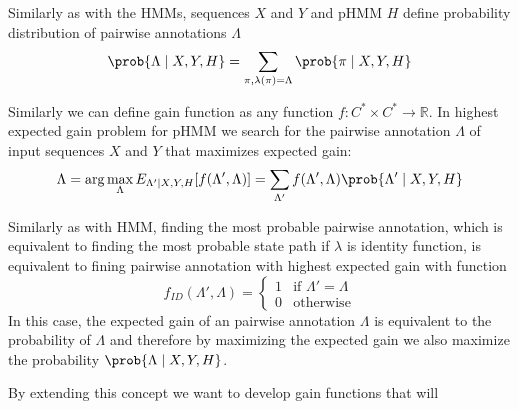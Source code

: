 Similarly as with the HMMs, sequences $X$ and $Y$ and pHMM $H$ define
probability distribution of pairwise annotations $\Lambda$
\[\prob{\Lambda\mid X,Y,H} = \sum_{\pi,\lambda(\pi)=\Lambda}\prob{\pi\mid
X,Y,H}\]

Similarly we can define gain function as any function $f:C^*\times C^*\to
\mathbb{R}$. In highest expected gain problem for pHMM we search for
the pairwise annotation $\Lambda$ of input sequences $X$ and $Y$ that maximizes
expected gain:
\[\Lambda = \arg\max_{\Lambda} E_{\Lambda'\mid X,Y,H}[f(\Lambda',\Lambda)]
=  \sum_{\Lambda'}f(\Lambda',\Lambda)\prob{\Lambda'\mid X,Y,H}\]

Similarly as with HMM, finding the most probable pairwise annotation, which is equivalent
to finding the most probable state path if $\lambda$ is identity function,
is equivalent to fining pairwise annotation with highest expected gain with
function
\[f_{ID}(\Lambda',\Lambda) = \begin{cases}
1 & \text{if $\Lambda'=\Lambda$}\\
0 & \text{otherwise}
\end{cases}\]
In this case, the expected gain of an pairwise annotation $\Lambda$ is
equivalent to the probability of $\Lambda$ and therefore by maximizing the
expected gain we also maximize the probability $\prob{\Lambda\mid X,Y,H}$.

By extending this concept we want to develop gain functions that will





